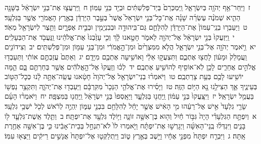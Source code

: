 \documentclass[18pt]{article}
\newcommand{\vart}[1]{\Bfootnote{#1}}	%
\begin{document}
 {\loc ז~}וַיִּֽחַר־אַ֥ף יְהֹוָ֖ה בְּיִשְׂרָאֵ֑ל וַֽיִּמְכְּרֵם֙ בְּיַד־פְּלִשְׁתִּ֔ים וּבְיַ֖ד בְּנֵ֥י עַמּֽוֹן׃ \startlock
 {\loc ח~}וַֽיִּרְעֲצ֤וּ  \edtext{וַיְרֹֽצְצוּ֙}{\vart{א=וַיְרֹֽצֲצוּ֙ (חטף) | }}  אֶת־בְּנֵ֣י יִשְׂרָאֵ֔ל בַּשָּׁנָ֖ה הַהִ֑יא שְׁמֹנֶ֨ה עֶשְׂרֵ֜ה שָׁנָ֗ה אֶֽת־כׇּל־בְּנֵ֤י יִשְׂרָאֵל֙ אֲשֶׁר֙ בְּעֵ֣בֶר הַיַּרְדֵּ֔ן בְּאֶ֥רֶץ הָאֱמֹרִ֖י אֲשֶׁ֥ר בַּגִּלְעָֽד׃ \startlock
 {\loc ט~}וַיַּעַבְר֤וּ בְנֵֽי־עַמּוֹן֙ אֶת־הַיַּרְדֵּ֔ן לְהִלָּחֵ֛ם גַּם־בִּֽיהוּדָ֥ה וּבְבִנְיָמִ֖ין וּבְבֵ֣ית אֶפְרָ֑יִם וַתֵּ֥צֶר לְיִשְׂרָאֵ֖ל מְאֹֽד׃ \startlock
 {\loc י~}וַֽיִּזְעֲקוּ֙ בְּנֵ֣י יִשְׂרָאֵ֔ל אֶל־יְהֹוָ֖ה לֵאמֹ֑ר חָטָ֣אנוּ לָ֔ךְ וְכִ֤י עָזַ֙בְנוּ֙ אֶת־אֱלֹהֵ֔ינוּ וַֽנַּעֲבֹ֖ד אֶת־הַבְּעָלִֽים׃ \startlock
 {\loc יא~}וַ֥יֹּאמֶר יְהֹוָ֖ה אֶל־בְּנֵ֣י יִשְׂרָאֵ֑ל הֲלֹ֤א מִמִּצְרַ֙יִם֙ וּמִן־הָ֣אֱמֹרִ֔י וּמִן־בְּנֵ֥י עַמּ֖וֹן וּמִן־פְּלִשְׁתִּֽים׃ \startlock
 {\loc יב~}וְצִידוֹנִ֤ים וַֽעֲמָלֵק֙ וּמָע֔וֹן לָחֲצ֖וּ אֶתְכֶ֑ם וַתִּצְעֲק֣וּ אֵלַ֔י וָאוֹשִׁ֥יעָה אֶתְכֶ֖ם מִיָּדָֽם׃ \startlock
 {\loc יג~}וְאַתֶּם֙ עֲזַבְתֶּ֣ם אוֹתִ֔י וַתַּעַבְד֖וּ אֱלֹהִ֣ים אֲחֵרִ֑ים לָכֵ֥ן לֹֽא־אוֹסִ֖יף לְהוֹשִׁ֥יעַ אֶתְכֶֽם׃ \startlock
 {\loc יד~}לְכ֗וּ וְזַֽעֲקוּ֙ אֶל־הָ֣אֱלֹהִ֔ים אֲשֶׁ֥ר בְּחַרְתֶּ֖ם בָּ֑ם הֵ֛מָּה יוֹשִׁ֥יעוּ לָכֶ֖ם בְּעֵ֥ת צָרַתְכֶֽם׃ \startlock
 {\loc טו~}וַיֹּאמְר֨וּ בְנֵי־יִשְׂרָאֵ֤ל אֶל־יְהֹוָה֙ חָטָ֔אנוּ עֲשֵֽׂה־אַתָּ֣ה לָ֔נוּ כְּכׇל־הַטּ֖וֹב בְּעֵינֶ֑יךָ אַ֛ךְ הַצִּילֵ֥נוּ נָ֖א הַיּ֥וֹם הַזֶּֽה׃ \startlock
 {\loc טז~}וַיָּסִ֜ירוּ אֶת־אֱלֹהֵ֤י הַנֵּכָר֙ מִקִּרְבָּ֔ם וַיַּעַבְד֖וּ אֶת־יְהֹוָ֑ה וַתִּקְצַ֥ר נַפְשׁ֖וֹ בַּעֲמַ֥ל יִשְׂרָאֵֽל׃ \startlock
 {\loc יז~}וַיִּצָּֽעֲקוּ֙ בְּנֵ֣י עַמּ֔וֹן וַֽיַּחֲנ֖וּ בַּגִּלְעָ֑ד וַיֵּאָֽסְפוּ֙ בְּנֵ֣י יִשְׂרָאֵ֔ל וַֽיַּחֲנ֖וּ בַּמִּצְפָּֽה׃ \startlock
 {\loc יח~}וַיֹּאמְר֨וּ הָעָ֜ם שָׂרֵ֤י גִלְעָד֙ אִ֣ישׁ אֶל־רֵעֵ֔הוּ מִ֣י הָאִ֔ישׁ אֲשֶׁ֣ר יָחֵ֔ל לְהִלָּחֵ֖ם בִּבְנֵ֣י עַמּ֑וֹן יִֽהְיֶ֣ה לְרֹ֔אשׁ לְכֹ֖ל יֹשְׁבֵ֥י גִלְעָֽד׃ 
\startlock
 {\loc א~}וְיִפְתָּ֣ח הַגִּלְעָדִ֗י הָיָה֙ גִּבּ֣וֹר חַ֔יִל וְה֖וּא בֶּן־אִשָּׁ֣ה זוֹנָ֑ה וַיּ֥וֹלֶד גִּלְעָ֖ד אֶת־יִפְתָּֽח׃ \startlock
 {\loc ב~}וַתֵּ֧לֶד אֵֽשֶׁת־גִּלְעָ֛ד ל֖וֹ בָּנִ֑ים וַיִּגְדְּל֨וּ בְֽנֵי־הָאִשָּׁ֜ה וַיְגָרְשׁ֣וּ אֶת־יִפְתָּ֗ח וַיֹּ֤אמְרוּ לוֹ֙ לֹא־תִנְחַ֣ל בְּבֵית־אָבִ֔ינוּ כִּ֛י בֶּן־אִשָּׁ֥ה אַחֶ֖רֶת אָֽתָּה׃ \startlock
 {\loc ג~}וַיִּבְרַ֤ח יִפְתָּח֙ מִפְּנֵ֣י אֶחָ֔יו וַיֵּ֖שֶׁב בְּאֶ֣רֶץ ט֑וֹב וַיִּֽתְלַקְּט֤וּ אֶל־יִפְתָּח֙ אֲנָשִׁ֣ים רֵיקִ֔ים וַיֵּצְא֖וּ עִמּֽוֹ׃ \startlock
\end{document}
